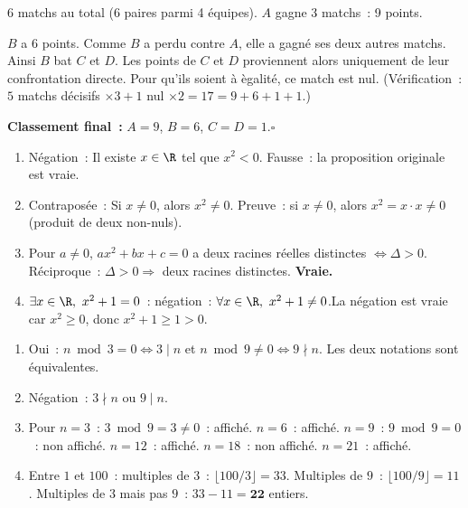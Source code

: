 
6 matchs au total (6 paires parmi 4 \'equipes). $A$ gagne 3 matchs~: 9 points.

$B$ a 6 points. Comme $B$ a perdu contre $A$, elle a gagn\'e ses deux autres
matchs. Ainsi $B$ bat $C$ et $D$. Les points de $C$ et $D$ proviennent alors
uniquement de leur confrontation directe. Pour qu'ils soient \`a \`egalit\'e,
ce match est nul.
(V\'erification~: $5$ matchs d\'ecisifs $\times3+1$ nul $\times2=17=9+6+1+1$.)

\textbf{Classement final~:} $A=9$, $B=6$, $C=D=1$.\hfill$\square$


\begin{enumerate}
  \item N\'egation~: \og Il existe $x\in\R$ tel que $x^2<0$.\fg
        Fausse~: la proposition originale est vraie.
  \item Contrapos\'ee~: \og Si $x\ne0$, alors $x^2\ne0$.\fg
        Preuve~: si $x\ne0$, alors $x^2=x\cdot x\ne0$ (produit de deux non-nuls).
  \item Pour $a\ne0$, $ax^2+bx+c=0$ a deux racines r\'eelles distinctes
        $\Leftrightarrow\Delta>0$.
        R\'eciproque~: $\Delta>0\Rightarrow$ deux racines distinctes. \textbf{Vraie.}
  \item \og$\exists x\in\R,\ x^2+1=0$\fg~: n\'egation~:
        \og$\forall x\in\R,\ x^2+1\ne0$.\fg La n\'egation est vraie
        car $x^2\geq0$, donc $x^2+1\geq1>0$.
\end{enumerate}


\begin{enumerate}
  \item Oui~: $n\bmod3=0\Leftrightarrow3\mid n$ et $n\bmod9\ne0\Leftrightarrow9\nmid n$.
        Les deux notations sont \'equivalentes.
  \item N\'egation~: \og$3\nmid n$ ou $9\mid n$\fg.
  \item Pour $n=3$~: $3\bmod9=3\ne0$~: affich\'e.
        $n=6$~: affich\'e. $n=9$~: $9\bmod9=0$~: non affich\'e.
        $n=12$~: affich\'e. $n=18$~: non affich\'e. $n=21$~: affich\'e.
  \item Entre $1$ et $100$~: multiples de $3$~: $\lfloor100/3\rfloor=33$.
        Multiples de $9$~: $\lfloor100/9\rfloor=11$.
        Multiples de $3$ mais pas $9$~: $33-11=\mathbf{22}$ entiers.
\end{enumerate}

